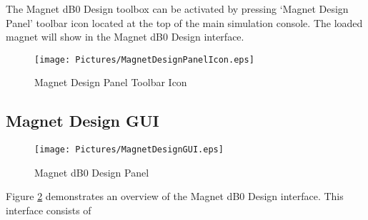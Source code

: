 \documentclass{book}%
\begin{document}
The Magnet dB0 Design toolbox can be activated by pressing `Magnet Design Panel' toolbar icon located at the top of the main simulation console. The loaded magnet will show in the Magnet dB0 Design interface.

\begin{figure}[htbp]
	\centering
		\texttt{[image: Pictures/MagnetDesignPanelIcon.eps]}
	\caption{Magnet Design Panel Toolbar Icon}
	\label{fig:MagnetDesignPanelIcon}
\end{figure}

\subsection{Magnet Design GUI}

\begin{figure}[htbp]
	\centering
		\texttt{[image: Pictures/MagnetDesignGUI.eps]}
	\caption{Magnet dB0 Design Panel}
	\label{fig:MagnetDesignGUI}
\end{figure}

Figure \ref{fig:MagnetDesignGUI} demonstrates an overview of the Magnet dB0 Design interface. This interface consists of 
\end{document}

